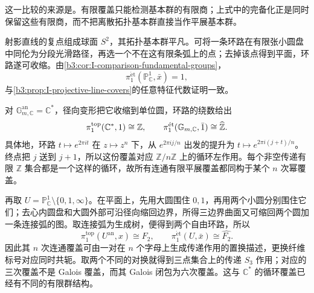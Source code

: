 这一比较的来源是\cite[Exposé XII, Corollaire 5.2, pp. 253--254]{SGA12003}。有限覆盖只能检测基本群的有限商；上式中的完备化正是同时保留这些有限商，而不把离散拓扑基本群直接当作平展基本群。

\begin{example}\label{b3:exm:I-complex-curve-groups}
	射影直线的复点组成球面 \(S^2\)，其拓扑基本群平凡。可将一条环路在有限张小圆盘中同伦为分段光滑路径，再选一个不在这有限条弧上的点；去掉该点得到平面，环路遂可收缩。由\cref{b3:cor:I-comparison-fundamental-groups}，
	\[
		\pi_1^{\mathrm{\acute et}}(\mathbb P_{\mathbb C}^1,\bar x)=1,
	\]
	与\cref{b3:prop:I-projective-line-covers}的任意特征代数证明一致。

	对 \(\mathbb G_{m,\mathbb C}^{\mathrm{an}}=\mathbb C^*\)，径向变形把它收缩到单位圆，环路的绕数给出
	\[
		\pi_1^{\mathrm{top}}(\mathbb C^*,1)\cong\mathbb Z,
		\qquad
		\pi_1^{\mathrm{\acute et}}(\mathbb G_{m,\mathbb C},\bar1)
		\cong\widehat{\vphantom{Z}\mathbb Z}.
	\]
	具体地，环路 \(t\mapsto e^{2\pi it}\) 在 \(z\mapsto z^n\) 下，从 \(e^{2\pi ij/n}\) 出发的提升为 \(t\mapsto e^{2\pi i(j+t)/n}\)。终点把 \(j\) 送到 \(j+1\)，所以这份覆盖对应 \(\mathbb Z/n\mathbb Z\) 上的循环左作用。每个非空传递有限 \(\mathbb Z\) 集合都是一个这样的循环，故所有连通有限平展覆盖都同构于某个 \(n\) 次幂覆盖。

	再取 \(U=\mathbb P_{\mathbb C}^1\setminus\{0,1,\infty\}\)。在平面上，先用大圆围住 \(0,1\)，再用两个小圆分别围住它们；去心内圆盘和大圆外部可沿径向缩回边界，所得三边界曲面又可缩回两个圆加一条连接弧的图。取连接弧为生成树，便得到两个自由环路，所以
	\[
		\pi_1^{\mathrm{top}}(U^{\mathrm{an}},x)\cong F_2,
		\qquad
		\pi_1^{\mathrm{\acute et}}(U,\bar x)\cong\widehat{F_2}.
	\]
	因此其 \(n\) 次连通覆盖可由一对在 \(n\) 个字母上生成传递作用的置换描述，更换纤维标号对应同时共轭。取两个不同的对换就得到三点集合上的传递 \(S_3\) 作用；对应的三次覆盖不是 Galois 覆盖，而其 Galois 闭包为六次覆盖。这与 \(\mathbb C^*\) 的循环覆盖已经有不同的有限群结构。
\end{example}


